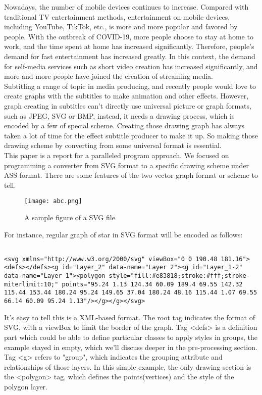 \documentclass[10pt,twocolumn,letterpaper]{article}
\numberwithin{figure}{section}
\begin{document}
Nowadays, the number of mobile devices continues to increase. Compared with traditional TV entertainment methods, entertainment on mobile devices, including YouTube, TikTok, etc., is more and more popular and favored by people. With the outbreak of COVID-19, more people choose to stay at home to work, and the time spent at home has increased significantly. Therefore, people's demand for fast entertainment has increased greatly. In this context, the demand for self-media services such as short video creation has increased significantly, and more and more people have joined the creation of streaming media. \\
Subtitling a range of topic in media producing, and recently people would love to create graphs with the subtitles to make animation and other effects. However, graph creating in subtitles can't directly use universal picture or graph formats, such as JPEG, SVG or BMP, instead, it needs a drawing process, which is encoded by a few of special scheme. Creating those drawing graph has always taken a lot of time for the effect subtitle producer to make it up. So making those drawing scheme by converting from some universal format is essential.\\
This paper is a report for a paralleled program approach. We focused on programming a converter from SVG format to a specific drawing scheme under ASS format. There are some features of the two vector graph format or scheme to tell.

\begin{figure}[h]
    \centering
    \texttt{[image: abc.png]}
    \caption{A sample figure of a SVG file}
    \label{fig:my_label}
\end{figure}

For instance, regular graph of star in SVG format will be encoded as follows:

\begin{lstlisting}

<svg xmlns="http://www.w3.org/2000/svg" viewBox="0 0 190.48 181.16"><defs></defs><g id="Layer_2" data-name="Layer 2"><g id="Layer_1-2" data-name="Layer 1"><polygon style="fill:#e83818;stroke:#fff;stroke-miterlimit:10;" points="95.24 1.13 124.34 60.09 189.4 69.55 142.32 115.44 153.44 180.24 95.24 149.65 37.04 180.24 48.16 115.44 1.07 69.55 66.14 60.09 95.24 1.13"/></g></g></svg>
\end{lstlisting}
It's easy to tell this is a XML-based format. The root tag indicates the format of SVG, with a viewBox to limit the border of the graph. Tag <defs> is a definition part which could be able to define particular classes to apply styles in groups, the example stayed in empty, which we'll discuss deeper in the pre-processing section. Tag <g> refers to "group", which indicates the grouping attribute and relationships of those layers. In this simple example, the only drawing section is the <polygon> tag, which defines the points(vertices) and the style of the polygon layer. 
\end{document}
